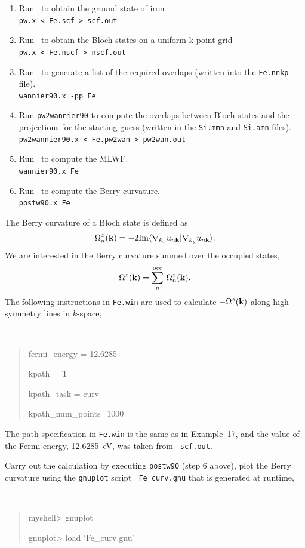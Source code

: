 \documentclass[a4paper,11pt,twoside]{article}
\begin{document}
\begin{enumerate}
\item Run \pwscf\ to obtain the ground state of iron\\
{\tt pw.x < Fe.scf > scf.out}

\item Run \pwscf\ to obtain the Bloch states on a uniform k-point
  grid\\ 
{\tt pw.x < Fe.nscf > nscf.out}

\item Run \wannier\ to generate a list of the required overlaps (written
  into the {\tt Fe.nnkp} file).\\
{\tt wannier90.x -pp Fe}

\item Run {\tt pw2wannier90} to compute the overlaps between Bloch
  states and the projections for the starting guess (written in the
  {\tt Si.mmn} and {\tt  Si.amn} files).\\
{\tt pw2wannier90.x < Fe.pw2wan > pw2wan.out}

\item Run \wannier\ to compute the MLWF.\\
{\tt wannier90.x Fe}

\item Run \postw\ to compute the Berry curvature.\\
{\tt postw90.x Fe}

\end{enumerate}

The  Berry curvature of a Bloch state is defined as
$$
\Omega_n^z({\bf k})=-2{\rm Im}
\langle \nabla_{k_x} u_{n{\bf k}}\vert \nabla_{k_y} u_{n{\bf k}}\rangle.
$$
%
We are interested in the Berry curvature summed over the occupied
states,
$$
\Omega^z({\bf k})=\sum_n^{\rm occ}\,\Omega_n^z({\bf k}).
$$
%
The following instructions in {\tt Fe.win} are used to
calculate $-\Omega^z({\bf k})$ along high symmetry lines 
in
$k$-space, 
{\tt
\begin{quote}
fermi\_energy = 12.6285

kpath = T

kpath\_task = curv

kpath\_num\_points=1000
\end{quote} }

The path specification in {\tt Fe.win} is the same as in Example~17,
and the value of the Fermi energy, 12.6285~eV, was taken from {\tt
  scf.out}. 

Carry out the calculation by executing {\tt postw90} (step 6 above),
plot the Berry curvature using the {\tt gnuplot} script {\tt
  Fe\_curv.gnu} that is generated at runtime,
{\tt
\begin{quote}
myshell> gnuplot

gnuplot> load `Fe\_curv.gnu'
\end{quote} }
\end{document}

